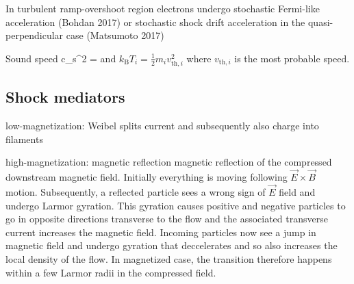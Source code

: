 \documentclass{aa}
\begin{document}
In turbulent ramp-overshoot region electrons undergo stochastic Fermi-like acceleration (Bohdan 2017) or stochastic shock drift acceleration in the quasi-perpendicular case (Matsumoto 2017)

Sound speed
\be
c_s^2 = 
\ee
and $k_{\mathrm{B}} T_i = \frac{1}{2} m_i v_{\mathrm{th},i}^2$ where $v_{\mathrm{th},i}$ is the most probable speed.






\subsection{Shock mediators}
low-magnetization: Weibel
splits current and subsequently also charge into filaments

high-magnetization: magnetic reflection
magnetic reflection of the compressed downstream magnetic field.
Initially everything is moving following $\vec{E} \times \vec{B}$ motion.
Subsequently, a reflected particle sees a wrong sign of $\vec{E}$ field  and undergo Larmor gyration.
This gyration causes positive and negative particles to go in opposite directions transverse to the flow and the associated transverse current increases the magnetic field.
Incoming particles now see a jump in magnetic field and undergo gyration that deccelerates and so also increases the local density of the flow.
In magnetized case, the transition therefore happens within a few Larmor radii in the compressed field.










\end{document}
